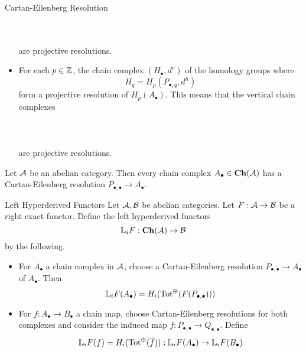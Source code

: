 \documentclass[a4paper]{article}
\begin{document}
\begin{defn}{Cartan-Eilenberg Resolution}{}
\begin{itemize}
\\~\\
are projective resolutions. 
\item For each $p\in\mathbb{Z}$, the chain complex $(H_\bullet,d^v)$ of the homology groups where $$H_q=H_p(P_{\bullet,q},d^h)$$ form a projective resolution of $H_p(A_\bullet)$. This means that the vertical chain complexes \\~\\
\\~\\
are projective resolutions. 
\end{itemize}
\end{defn}

\begin{thm}{}{} Let $\mathcal{A}$ be an abelian category. Then every chain complex $A_\bullet\in\bold{Ch}(\mathcal{A})$ has a Cartan-Eilenberg resolution $P_{\bullet,\bullet}\to A_\bullet$. 
\end{thm}

\begin{defn}{Left Hyperderived Functors}{} Let $\mathcal{A},\mathcal{B}$ be abelian categories. Let $F:\mathcal{A}\to\mathcal{B}$ be a right exact functor. Define the left hyperderived functors $$\mathbb{L}_i F:\bold{Ch}(\mathcal{A})\to\mathcal{B}$$ by the following. 
\begin{itemize}
\item For $A_\bullet$ a chain complex in $\mathcal{A}$, choose a Cartan-Eilenberg resolution $P_{\bullet,\bullet}\to A_\bullet$ of $A_\bullet$. Then $$\mathbb{L}_i F(A_\bullet)=H_i(\text{Tot}^\oplus(F(P_{\bullet,\bullet})))$$
\item For $f:A_\bullet\to B_\bullet$ a chain map, choose Cartan-Eilenberg resolutions for both complexes and consider the induced map $\overline{f}:P_{\bullet,\bullet}\to Q_{\bullet,\bullet}$. Define $$\mathbb{L}_i F(f)=H_i(\text{Tot}^\oplus(\overline{f})):\mathbb{L}_iF(A_\bullet)\to\mathbb{L}_iF(B_\bullet)$$
\end{itemize}
\end{defn}
\end{document}
